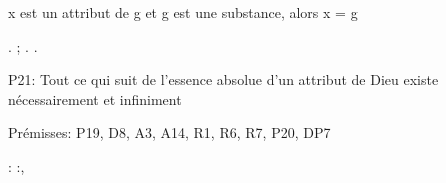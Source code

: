 \documentclass[10pt]{report}
\begin{document}
\begin{coqdoccode}
\begin{coqdoccomment}
x\coqdocindent{0.50em}
est\coqdocindent{0.50em}
un\coqdocindent{0.50em}
attribut\coqdocindent{0.50em}
de\coqdocindent{0.50em}
g\coqdocindent{0.50em}
et\coqdocindent{0.50em}
g\coqdocindent{0.50em}
est\coqdocindent{0.50em}
une\coqdocindent{0.50em}
substance,\coqdocindent{0.50em}
alors\coqdocindent{0.50em}
x\coqdocindent{0.50em}
=\coqdocindent{0.50em}
g\coqdocindent{0.50em}
\end{coqdoccomment}
\coqdoceol
\coqdocindent{1.00em}
 . ; .\coqdoceol
\coqdocnoindent
{}.\coqdoceol
\coqdocemptyline
\coqdocnoindent
\begin{coqdoccomment}
\coqdocindent{0.50em}
P21:\coqdocindent{0.50em}
Tout\coqdocindent{0.50em}
ce\coqdocindent{0.50em}
qui\coqdocindent{0.50em}
suit\coqdocindent{0.50em}
de\coqdocindent{0.50em}
l'essence\coqdocindent{0.50em}
absolue\coqdocindent{0.50em}
d'un\coqdocindent{0.50em}
attribut\coqdocindent{0.50em}
de\coqdocindent{0.50em}
Dieu\coqdocindent{0.50em}
existe\coqdocindent{0.50em}
nécessairement\coqdocindent{0.50em}
et\coqdocindent{0.50em}
infiniment\coqdocindent{0.50em}
\end{coqdoccomment}
\coqdoceol
\coqdocnoindent
\begin{coqdoccomment}
\coqdocindent{0.50em}
Prémisses:\coqdocindent{0.50em}
P19,\coqdocindent{0.50em}
D8,\coqdocindent{0.50em}
A3,\coqdocindent{0.50em}
A14,\coqdocindent{0.50em}
R1,\coqdocindent{0.50em}
R6,\coqdocindent{0.50em}
R7,\coqdocindent{0.50em}
P20,\coqdocindent{0.50em}
DP7\coqdocindent{0.50em}
\end{coqdoccomment}
\coqdoceol
\coqdocnoindent
{}  : \coqdockw{\ensuremath{\forall}} :,\coqdoceol
\coqdocindent{1.00em}

\end{coqdoccode}
\end{document}
